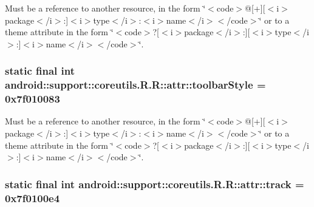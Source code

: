 Must be a reference to another resource, in the form \char`\"{}$<$code$>$@\mbox{[}+\mbox{]}\mbox{[}$<$i$>$package$<$/i$>$:\mbox{]}$<$i$>$type$<$/i$>$:$<$i$>$name$<$/i$>$$<$/code$>$\char`\"{} or to a theme attribute in the form \char`\"{}$<$code$>$?\mbox{[}$<$i$>$package$<$/i$>$:\mbox{]}\mbox{[}$<$i$>$type$<$/i$>$:\mbox{]}$<$i$>$name$<$/i$>$$<$/code$>$\char`\"{}. \hypertarget{classandroid_1_1support_1_1coreutils_1_1_r_1_1attr_8d97bdbc05f27ce64bf781ee5e158db6}{
\subsubsection[{toolbarStyle}]{\setlength{\rightskip}{0pt plus 5cm}static final int android::support::coreutils.R.R::attr::toolbarStyle = 0x7f010083}}
\label{classandroid_1_1support_1_1coreutils_1_1_r_1_1attr_8d97bdbc05f27ce64bf781ee5e158db6}


Must be a reference to another resource, in the form \char`\"{}$<$code$>$@\mbox{[}+\mbox{]}\mbox{[}$<$i$>$package$<$/i$>$:\mbox{]}$<$i$>$type$<$/i$>$:$<$i$>$name$<$/i$>$$<$/code$>$\char`\"{} or to a theme attribute in the form \char`\"{}$<$code$>$?\mbox{[}$<$i$>$package$<$/i$>$:\mbox{]}\mbox{[}$<$i$>$type$<$/i$>$:\mbox{]}$<$i$>$name$<$/i$>$$<$/code$>$\char`\"{}. \hypertarget{classandroid_1_1support_1_1coreutils_1_1_r_1_1attr_d50da3e293baa1702a00a4d547f8ea37}{
\subsubsection[{track}]{\setlength{\rightskip}{0pt plus 5cm}static final int android::support::coreutils.R.R::attr::track = 0x7f0100e4}}
\label{classandroid_1_1support_1_1coreutils_1_1_r_1_1attr_d50da3e293baa1702a00a4d547f8ea37}


